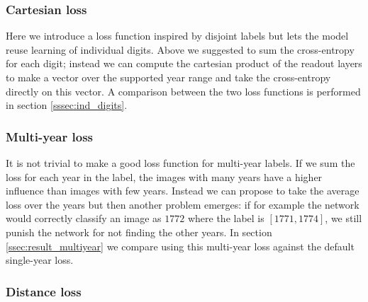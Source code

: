 

\subsubsection{Cartesian loss} \label{sssec:cartesian}

%

Here we introduce a loss function inspired by disjoint labels but lets the model reuse learning of individual digits. Above we suggested to sum the cross-entropy for each digit; instead we can compute the cartesian product of the readout layers to make a vector over the supported year range and take the cross-entropy directly on this vector. A comparison between the two loss functions is performed in section \ref{sssec:ind_digits}.


\subsubsection{Multi-year loss} \label{sssec:alt_multiyear}

It is not trivial to make a good loss function for multi-year labels. If we sum the loss for each year in the label, the images with many years have a higher influence than images with few years. Instead we can propose to take the average loss over the years but then another problem emerges: if for example the network would correctly classify an image as $1772$ where the label is $[1771, 1774]$, we still punish the network for not finding the other years.
In section \ref{ssec:result_multiyear} we compare using this multi-year loss against the default single-year loss.

\subsubsection{Distance loss}

